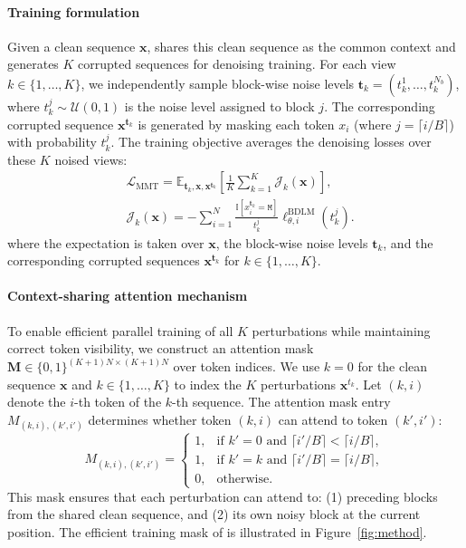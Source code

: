 \paragraph{Training formulation}
Given a clean sequence $\mathbf{x}$, \name{} shares this clean sequence as the common context and generates $K$ corrupted sequences for denoising training.
For each view $k\in\{1,\ldots,K\}$, we independently sample block-wise noise levels $\boldsymbol{t}_k = (t_k^1, \dots, t_k^{N_b})$, where $t_k^j\sim\mathcal{U}(0,1)$ is the noise level assigned to block $j$.
The corresponding corrupted sequence $\mathbf{x}^{\boldsymbol{t}_k}$ is generated by masking each token $x_i$ (where $j=\lceil i/B \rceil$) with probability $t_k^j$.
The training objective averages the denoising losses over these $K$ noised views:
\begin{equation}
\begin{aligned}
&\mathcal{L}_{\mathrm{MMT}}
=
\mathbb{E}_{\boldsymbol{t}_k,\mathbf{x},\mathbf{x}^{\boldsymbol{t}_k}}
\left[
\frac{1}{K}
\sum_{k=1}^{K}
\mathcal{J}_{k}(\mathbf{x})
\right], \\
&\mathcal{J}_{k}(\mathbf{x})
=
-\sum_{i=1}^{N}
    \frac{
    \mathbb{I}\!\left[x_i^{\boldsymbol{t}_k}=\mathtt{M}\right]
    }{
    t_k^j
    }
    \ell_{\theta,i}^{\mathrm{BDLM}}(t_k^j).
\end{aligned}
\label{eq:mmt_loss}
\end{equation}
where the expectation is taken over $\mathbf{x}$, the block-wise noise levels $\boldsymbol{t}_k$, and the corresponding corrupted sequences $\mathbf{x}^{\boldsymbol{t}_k}$ for $k \in \{1,\ldots,K\}$.

\paragraph{Context-sharing attention mechanism}
To enable efficient parallel training of all $K$ perturbations while maintaining correct token visibility, we construct an attention mask $\mathbf{M} \in \{0, 1\}^{(K+1)N \times (K+1)N}$ over token indices.
We use $k = 0$ for the clean sequence $\mathbf{x}$ and $k \in \{1, \ldots, K\}$ to index the $K$ perturbations $\mathbf{x}^{t_k}$.
Let $(k, i)$ denote the $i$-th token of the $k$-th sequence.
The attention mask entry $M_{(k,i), (k',i')}$ determines whether token $(k,i)$ can attend to token $(k',i')$:
\begin{equation}
    M_{(k,i), (k',i')} =
    \begin{cases}
        1, & \text{if } k' = 0 \text{ and } \lceil i' / B \rceil < \lceil i / B \rceil, \\
        1, & \text{if } k' = k \text{ and } \lceil i' / B \rceil = \lceil i / B \rceil, \\
        0, & \text{otherwise}.
    \end{cases}
\label{eq:attn_mask}
\end{equation}
This mask ensures that each perturbation can attend to: (1) preceding blocks from the shared clean sequence, and (2) its own noisy block at the current position.
The efficient training mask of \name{} is illustrated in Figure~\ref{fig:method}.

